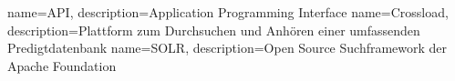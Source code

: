 {
    name={API},
    description={Application Programming Interface}
}
{
    name={Crossload},
    description={Plattform zum Durchsuchen und Anhören einer umfassenden Predigtdatenbank}
}
{
    name={SOLR},
    description={Open Source Suchframework der Apache Foundation}
}


\glsaddall
